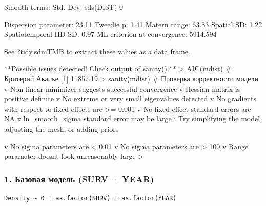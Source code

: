 \documentclass[
  letterpaper,
  DIV=11,
  numbers=noendperiod]{scrreprt}
\newenvironment{Shaded}{\begin{snugshade}}{\end{snugshade}}
\newcommand{\NormalTok}[1]{\textcolor[rgb]{0.00,0.23,0.31}{#1}}
\newcommand{\SpecialCharTok}[1]{\textcolor[rgb]{0.37,0.37,0.37}{#1}}
\newcommand{\StringTok}[1]{\textcolor[rgb]{0.13,0.47,0.30}{#1}}
\begin{document}
\begin{Shaded}
\begin{Highlighting}[]
\StringTok{Smooth terms:}
\StringTok{          Std. Dev.}
\StringTok{sds(DIST)         0}

\StringTok{Dispersion parameter: 23.11}
\StringTok{Tweedie p: 1.41}
\StringTok{Matern range: 63.83}
\StringTok{Spatial SD: 1.22}
\StringTok{Spatiotemporal IID SD: 0.97}
\StringTok{ML criterion at convergence: 5914.594}

\StringTok{See ?tidy.sdmTMB to extract these values as a data frame.}

\StringTok{**Possible issues detected! Check output of sanity().**}
\StringTok{\textgreater{} AIC(mdist)  \# Критерий Акаике}
\StringTok{[1] 11857.19}
\StringTok{\textgreater{} sanity(mdist)  \# Проверка корректности модели}
\StringTok{v Non{-}linear minimizer suggests successful convergence}
\StringTok{v Hessian matrix is positive definite}
\StringTok{v No extreme or very small eigenvalues detected}
\StringTok{v No gradients with respect to fixed effects are \textgreater{}= 0.001}
\StringTok{v No fixed{-}effect standard errors are NA}
\StringTok{x \textasciigrave{}ln\_smooth\_sigma\textasciigrave{} standard error may be large}
\StringTok{i Try simplifying the model, adjusting the mesh, or adding priors}

\StringTok{v No sigma parameters are \textless{} 0.01}
\StringTok{v No sigma parameters are \textgreater{} 100}
\StringTok{v Range parameter doesn\textquotesingle{}}\NormalTok{t look unreasonably large}
\SpecialCharTok{\textgreater{}} 
\end{Highlighting}
\end{Shaded}

\subsubsection{\texorpdfstring{\textbf{1. Базовая модель (SURV +
YEAR)}}{1. Базовая модель (SURV + YEAR)}}\label{ux431ux430ux437ux43eux432ux430ux44f-ux43cux43eux434ux435ux43bux44c-surv-year}

\begin{verbatim}
Density ~ 0 + as.factor(SURV) + as.factor(YEAR)
\end{verbatim}
\end{document}
